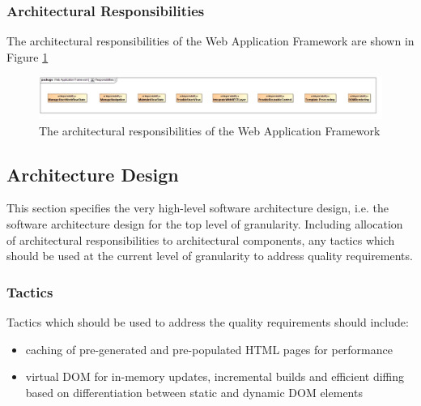 \subsubsection{Architectural Responsibilities}
The architectural responsibilities of the Web Application Framework are shown in 
Figure \ref{fig:webApplicationFrameworkResponsibilities}
\begin{figure}[H]
	\begin{center}
	\includegraphics[scale=0.35]{../Diagrams and Charts/Web Application Framework/Responsibilities.jpg}
	\caption{The architectural responsibilities of the Web Application Framework}
	\label{fig:webApplicationFrameworkResponsibilities}
	\end{center}
\end{figure}

\subsection{Architecture Design}
This section specifies the very high-level software architecture design, i.e.
the software architecture design for the top level of granularity. Including 
allocation of architectural responsibilities to architectural components, any
tactics which should be used at the current level of granularity to address
quality requirements.

\subsubsection{Tactics}
Tactics which should be used to address the quality requirements should include:
\begin{itemize}
	\item caching of pre-generated and pre-populated HTML pages for performance
	\item virtual DOM for in-memory updates, incremental builds and efficient 
	diffing based on differentiation between static and dynamic DOM elements
\end{itemize}
